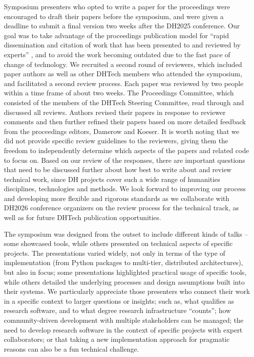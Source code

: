 \documentclass[final]{anthology-ch} %
\begin{document}
Symposium presenters who opted to write a paper for the proceedings were encouraged to draft their papers before the symposium, and were given a deadline to submit a final version two weeks after the DH2025 conference. Our goal was to take advantage of the proceedings publication model for ``rapid dissemination and citation of work that has been presented to and reviewed by experts'' \cite{10.63744@rWDzgqfDLYNm}, and to avoid the work becoming outdated due to the fast pace of change of technology. We recruited a second round of reviewers, which included paper authors as well as other DHTech members who attended the symposium, and facilitated a second review process. Each paper was reviewed by two people within a time frame of about two weeks. The Proceedings Committee, which consisted of the members of the DHTech Steering Committee, read through and discussed all reviews. Authors revised their papers in response to reviewer comments and then further refined their papers based on more detailed feedback from the proceedings editors, Damerow and Koeser. It is worth noting that we did not provide specific review guidelines to the reviewers, giving them the freedom to independently determine which aspects of the papers and related code to focus on. Based on our review of the responses, there are important questions that need to be discussed further about how best to write about and review technical work, since DH projects cover such a wide range of humanities disciplines, technologies and methods.  We look forward to improving our process and developing more flexible and rigorous standards as we collaborate with DH2026 conference organizers on the review process for the technical track, as well as for future DHTech publication opportunities.

The symposium was designed from the outset to include different kinds of talks -- some showcased tools, while others presented on technical aspects of specific projects. The presentations varied widely, not only in terms of the type of implementation (from Python packages to multi-tier, distributed architectures), but also in focus; some presentations highlighted practical usage of specific tools, while others detailed the underlying processes and design assumptions built into their systems. We particularly appreciate those presenters who connect their work in a specific context to larger questions or insights; such as, what qualifies as research software, and to what degree research infrastructure ``counts''; how community-driven development with multiple stakeholders can be managed; the need to develop research software in the context of specific projects with expert collaborators; or that taking a new implementation approach for pragmatic reasons can also be a fun technical challenge.
\end{document}
